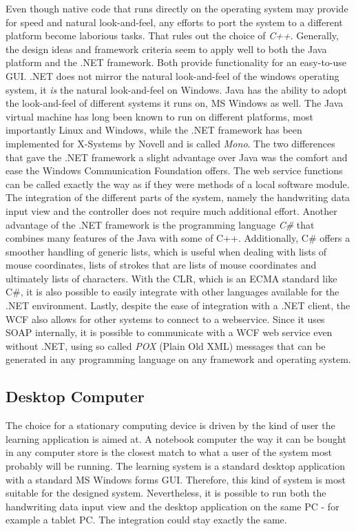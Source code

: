 Even though native code that runs directly on the operating system may 
provide for speed and natural look-and-feel, any efforts to port the system
to a different platform become laborious tasks. That rules out the choice of
\emph{C++}.
Generally, the design ideas and framework criteria seem to apply well to both 
the Java platform and the .NET framework. Both provide functionality for an 
easy-to-use GUI. .NET does not mirror the natural look-and-feel of the windows
operating system, it \emph{is} the natural look-and-feel on Windows.
Java has the ability to adopt the look-and-feel of different systems it runs on,
MS Windows as well. The Java virtual machine has long been known to run on 
different platforms, most importantly Linux and Windows, 
while the .NET framework has been implemented for X-Systems by Novell and is 
called \emph{Mono}.
The two differences that gave the .NET framework a slight advantage over Java 
was the comfort and ease the Windows Communication Foundation offers.
The web service functions can be called exactly the way as if they were methods 
of a local software module. The integration of the different parts of the system,
namely the handwriting data input view and the controller does not require much
additional effort. Another advantage of the .NET framework is the programming
language \emph{C\#} that combines many features of the Java with some of C++.
Additionally, C\# offers a smoother handling of generic lists, which is useful
when dealing with lists of mouse coordinates, lists of strokes that are lists
of mouse coordinates and ultimately lists of characters.
With the CLR, which is an ECMA standard like C\#, it is also possible to easily 
integrate with other languages available for the .NET environment.
Lastly, despite the ease of integration with a .NET client, the WCF also allows 
for other systems to connect to a webservice. Since it uses SOAP internally, 
it is possible to communicate with a WCF web service even without .NET, using
so called \emph{POX} (Plain Old XML) messages that can be generated in any
programming language on any framework and operating system.

\subsection{Desktop Computer}
\label{sec:desktopcomputer}

The choice for a stationary computing device is driven by the kind of user
the learning application is aimed at. A notebook computer the way it can be 
bought in any computer store is the closest match to what a user of the system  
most probably will be running. 
The learning system is a standard desktop application with a standard 
MS Windows forms GUI. Therefore, this kind of system is most suitable for the
designed system.
Nevertheless, it is possible to run both the handwriting data input view and
the desktop application on the same PC - for example a tablet PC.
The integration could stay exactly the same.

